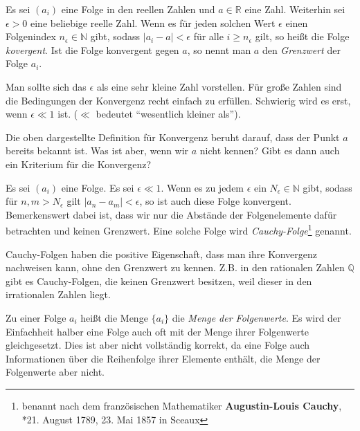 \begin{definition}\label{def:lim}
Es sei $(a_i)$ eine Folge in den reellen Zahlen und $a\in \mathbb{R}$ eine Zahl. Weiterhin sei $\epsilon>0$ eine beliebige reelle Zahl. Wenn es für jeden solchen Wert $\epsilon$ einen Folgenindex $n_\epsilon \in \mathbb{N}$ gibt, sodass $\vert a_i -a\vert <\epsilon$ für alle $i\ge n_\epsilon$ gilt, so heißt die Folge \textsl{kovergent}. Ist die Folge konvergent gegen $a$, so nennt man $a$ den \textsl{Grenzwert} der Folge $a_i$.
\end{definition}

Man sollte sich das $\epsilon$ als eine sehr kleine Zahl vorstellen. Für große Zahlen sind die Bedingungen der Konvergenz recht einfach zu erfüllen. Schwierig wird es erst, wenn $\epsilon\ll 1$ ist. ($\ll$ bedeutet "`wesentlich kleiner als"').

Die oben dargestellte Definition für Konvergenz beruht darauf, dass der Punkt $a$ bereits bekannt ist. Was ist aber, wenn wir $a$ nicht kennen? Gibt es dann auch ein Kriterium für die Konvergenz?

\begin{definition}
Es sei $(a_i)$ eine Folge. Es sei $\epsilon \ll 1$. Wenn es zu jedem $\epsilon$ ein $N_\epsilon \in \mathbb{N}$ gibt, sodass für $n,m > N_\epsilon $ gilt $\vert a_n -a_m \vert <\epsilon$, so ist auch diese Folge konvergent. Bemerkenswert dabei ist, dass wir nur die Abstände der Folgenelemente dafür betrachten und keinen Grenzwert. Eine solche Folge wird \textsl{Cauchy-Folge}\footnote{benannt nach dem französischen Mathematiker \textbf{Augustin-Louis Cauchy}, *21. August 1789, 23. Mai 1857 in Sceaux} genannt.
\end{definition}

Cauchy-Folgen haben die positive Eigenschaft, dass man ihre Konvergenz nachweisen kann, ohne den Grenzwert zu kennen. Z.B. in den rationalen Zahlen $\mathbb{Q}$ gibt es Cauchy-Folgen, die keinen Grenzwert besitzen, weil dieser in den irrationalen Zahlen liegt.


\begin{definition}
Zu einer Folge $a_i$ heißt die Menge $\lbrace a_i \rbrace$ die \textsl{Menge der Folgenwerte}. Es wird der Einfachheit halber eine Folge auch oft mit der Menge ihrer Folgenwerte gleichgesetzt. Dies ist aber nicht vollständig korrekt, da eine Folge auch Informationen über die Reihenfolge ihrer Elemente enthält, die Menge der Folgenwerte aber nicht. 
\end{definition}

